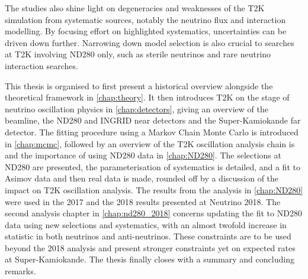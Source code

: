 The studies also shine light on degeneracies and weaknesses of the T2K simulation from systematic sources, notably the neutrino flux and interaction modelling. By focusing effort on highlighted systematics, uncertainties can be driven down further. Narrowing down model selection is also crucial to searches at T2K involving ND280 only, such as sterile neutrinos and rare neutrino interaction searches.

This thesis is organised to first present a historical overview alongside the theoretical framework in \autoref{chap:theory}. It then introduces T2K on the stage of neutrino oscillation physics in \autoref{chap:detectors}, giving an overview of the beamline, the ND280 and INGRID near detectors and the Super-Kamiokande far detector. The fitting procedure using a Markov Chain Monte Carlo is introduced in \autoref{chap:mcmc}, followed by an overview of the T2K oscillation analysis chain is and the importance of using ND280 data in \autoref{chap:ND280}. The selections at ND280 are presented, the parameterisation of systematics is detailed, and a fit to Asimov data and then real data is made, rounded off by a discussion of the impact on T2K oscillation analysis. The results from the analysis in \autoref{chap:ND280} were used in the 2017\cite{t2k_2017} and the 2018 results presented at Neutrino 2018\cite{t2k_neutrino2018}. The second analysis chapter in \autoref{chap:nd280_2018} concerns updating the fit to ND280 data using new selections and systematics, with an almost twofold increase in statistic in both neutrinos and anti-neutrinos. These constraints are to be used beyond the 2018 analysis and present stronger constraints yet on expected rates at Super-Kamiokande. The thesis finally closes with a summary and concluding remarks.
